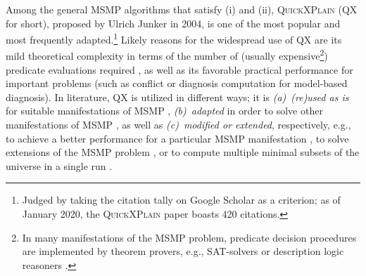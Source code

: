 \documentclass[]{elsarticle}
\begin{document}
	Among the general MSMP algorithms that satisfy (i) and (ii), \textsc{QuickXPlain} \cite{junker04} (QX for short), proposed by Ulrich Junker in 2004, is one of the most popular and most frequently adapted.\footnote{Judged by taking the citation tally on Google Scholar as a criterion; as of January 2020, the \textsc{QuickXPlain} paper boasts 420 citations.} 
	Likely reasons for the widespread use of QX are its mild theoretical complexity in terms of the number of (usually expensive\footnote{In many manifestations of the MSMP problem, predicate decision procedures are implemented by theorem provers, e.g., SAT-solvers \cite{marques2013minimal} or description logic reasoners \cite{Rodler2015phd}.}) predicate evaluations required \cite{marques2013minimal,junker04}, as well as its favorable practical performance for important problems (such as conflict \cite{shchekotykhin2008computing} or diagnosis \cite{Shchekotykhin2014} computation for model-based diagnosis).
	In literature, QX is utilized in different ways; it is \emph{(a)}~\emph{(re)used as is} for suitable manifestations of MSMP \cite{DBLP:journals/ai/FelfernigFJS04}, \emph{(b)}~\emph{adapted} in order to solve other manifestations of MSMP \cite{Rodler2015phd}, as well as \emph{(c)}~\emph{modified or extended}, respectively, e.g., to achieve a better performance for a particular MSMP manifestation \cite{marques2013minimal}, to solve extensions of the MSMP problem \cite{DBLP:journals/corr/Rodler2017}, or to compute multiple minimal subsets of the universe in a single run \cite{shchekotykhin2015mergexplain}.
	
\end{document}
